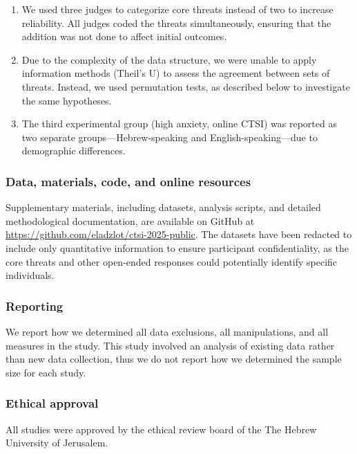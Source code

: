 \documentclass[
  man,floatsintext]{apa7}
\providecommand{\tightlist}{%
  \setlength{\itemsep}{0pt}\setlength{\parskip}{0pt}}
\begin{document}
\begin{enumerate}
\def\labelenumi{\arabic{enumi}.}
\tightlist
\item
  We used three judges to categorize core threats instead of two to increase reliability. All judges coded the threats simultaneously, ensuring that the addition was not done to affect initial outcomes.
\item
  Due to the complexity of the data structure, we were unable to apply information methods (Theil's U) to assess the agreement between sets of threats. Instead, we used permutation tests, as described below to investigate the same hypotheses.
\item
  The third experimental group (high anxiety, online CTSI) was reported as two separate groups---Hebrew-speaking and English-speaking---due to demographic differences.
\end{enumerate}

\subsubsection{Data, materials, code, and online resources}\label{data-materials-code-and-online-resources}

Supplementary materials, including datasets, analysis scripts, and detailed methodological documentation, are available on GitHub at \url{https://github.com/eladzlot/ctsi-2025-public}.
The datasets have been redacted to include only quantitative information to ensure participant confidentiality, as the core threats and other open-ended responses could potentially identify specific individuals.

\subsubsection{Reporting}\label{reporting}

We report how we determined all data exclusions, all manipulations, and all measures in the study.
This study involved an analysis of existing data rather than new data collection, thus we do not report how we determined the sample size for each study.

\subsubsection{Ethical approval}\label{ethical-approval}

All studies were approved by the ethical review board of the The Hebrew University of Jerusalem.
\end{document}
